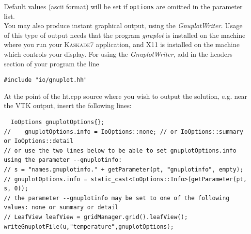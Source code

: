 \documentclass[11pt]{article}
\newcommand{\K}{\textsc{Kaskade7 }}
\begin{document}
\noindent Default values (ascii format) will be set if {\tt options}  are omitted in the parameter list. \\

\noindent You may also produce instant graphical output, using the {\it GnuplotWriter}. Usage of this type of output needs that the program {\it gnuplot} is installed on the machine where you run your \K application, and X11 is installed on the machine which controls your display. For using the {\it GnuplotWriter}, add in the headers-section of your program the line 
\begin{lstlisting}
#include "io/gnuplot.hh"
\end{lstlisting}

\noindent At the point of the ht.cpp source where you wish to output the solution, e.g. near the VTK output, insert the following lines:

\begin{lstlisting}
  IoOptions gnuplotOptions{};
//    gnuplotOptions.info = IoOptions::none; // or IoOptions::summary or IoOptions::detail
// or use the two lines below to be able to set gnuplotOptions.info using the parameter --gnuplotinfo:
// s = "names.gnuplotinfo." + getParameter(pt, "gnuplotinfo", empty);
// gnuplotOptions.info = static_cast<IoOptions::Info>(getParameter(pt, s, 0));
// the parameter --gnuplotinfo may be set to one of the following values: none or summary or detail
// LeafView leafView = gridManager.grid().leafView();
writeGnuplotFile(u,"temperature",gnuplotOptions);
\end{lstlisting}
\end{document}
